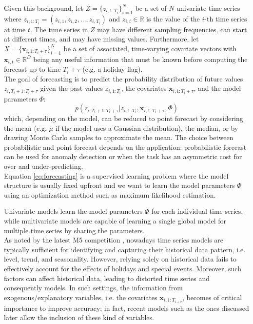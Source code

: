 \documentclass[a4paper, 12pt]{article} %
\begin{document}
	Given this background, let $Z=\{ z_{i, 1:T_i} \}_{i=1}^{N}$ be a  set of $N$ univariate time series where $z_{i, 1:T_i} = (z_{i,1}, z_{i,2}, ..., z_{i,T_i})$ and $z_{i,t} \in \mathbb{R}$ is the value of the $i$-th time series at time $t$. The time series in $Z$ may have different sampling frequencies, can start at different times, and may have missing values. Furthermore, let $X=\{\pmb{x}_{i, 1:T_i+\tau} \}_{i=1}^{N}$ be a set of associated, time-varying covariate vectors with $\pmb{x}_{i,t} \in \mathbb{R}^D$ being any useful information that must be known before computing the forecast up to time $T_i + \tau$ (e.g. a holiday flag).\\
	The goal of forecasting \cite{ForecastingHyndmanAthanasopoulos} is to predict the probability distribution of future values $z_{i,T_{i}+1:T_i+\tau}$ given the past values $z_{i, 1:T_i}$, the covariates $\pmb{x}_{i, 1:T_i + \tau}$, and the model parameters $\Phi$:
	\begin{equation} \label{eq:forecasting}
		p(z_{i,T_{i}+1:T_i+\tau} | z_{i, 1:T_i}, \pmb{x}_{i, 1:T_i + \tau}, \Phi)
	\end{equation}
	which, depending on the model, can be reduced to point forecast by considering the mean (e.g. $\mu$ if the model uses a Gaussian distribution), the median, or by drawing Monte Carlo samples to approximate the mean. The choice between probabilistic and point forecast depends on the application: probabilistic forecast can be used for anomaly detection or when the task has an asymmetric cost for over and under-predicting. \\
	Equation \ref{eq:forecasting} is a supervised learning problem where the model structure is usually fixed upfront and we want to learn the model parameters $\Phi$ using an optimization method such as maximum likelihood estimation.
	
	Univariate models learn the model parameters $\Phi$ for each individual time series, while multivariate models are capable of learning a single global model for multiple time series by sharing the parameters.\\
	As noted by the latest M5 competition \cite{M5Competition}, nowadays time series models are typically sufficient for identifying and capturing their historical data pattern, i.e. level, trend, and seasonality. However, relying solely on historical data fails to effectively account for the effects of holidays and special events. Moreover, such factors can affect historical data, leading to distorted time series and consequently models. In such settings, the information from exogenous/explanatory variables, i.e.  the covariates $\pmb{x}_{i, 1:T_{i+\tau}}$, becomes of critical importance to improve accuracy; in fact, recent models such as the ones discussed later \cite{FacebookProphet, DeepAR, DeepState} allow the inclusion of these kind of variables.
	
\end{document}
